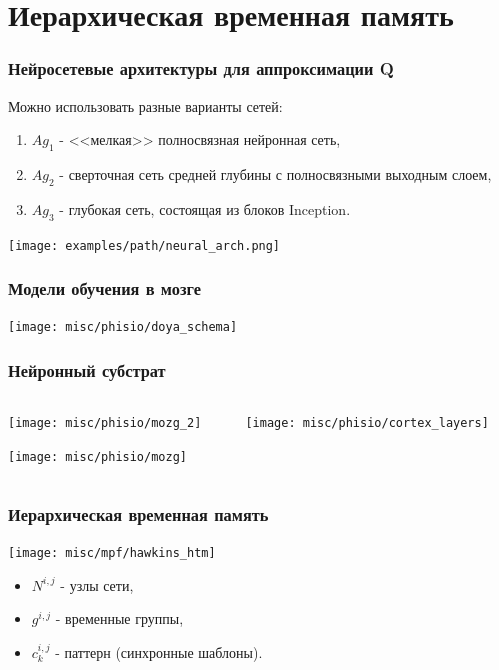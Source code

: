 \documentclass[12pt]{beamer}
\begin{document}
	\section{Иерархическая временная память}

	\begin{frame}
		\frametitle{Нейросетевые архитектуры для аппроксимации Q}
		Можно использовать разные варианты сетей:
		\begin{enumerate}
			\item $Ag_1$ - <<мелкая>> полносвязная нейронная сеть,
			\item $Ag_2$ - сверточная сеть средней глубины с полносвязными выходным слоем,
			\item $Ag_3$ - глубокая сеть, состоящая из блоков Inception.
		\end{enumerate}
		\centering
		\texttt{[image: examples/path/neural\_arch.png]}
	\end{frame}
	
	\begin{frame}
		\frametitle{Модели обучения в мозге}
		
		\begin{center}
			\texttt{[image: misc/phisio/doya\_schema]}
		\end{center}

	\end{frame}	
	
	\begin{frame}
		\frametitle{Нейронный субстрат}
		
		\begin{columns}
		\begin{column}{0.35\textwidth}
			\texttt{[image: misc/phisio/mozg\_2]}
			\par\bigskip
			\hspace{-7mm}\texttt{[image: misc/phisio/mozg]}
		\end{column}
		\begin{column}{0.65\textwidth}
			\texttt{[image: misc/phisio/cortex\_layers]}
		\end{column}
		\end{columns}

	\end{frame}
		
		
	\begin{frame}
		\frametitle{Иерархическая временная память}
		
		\begin{center}
		\texttt{[image: misc/mpf/hawkins\_htm]}
		\end{center}
		\par\bigskip
		\begin{itemize}
			\item $N^{i,j}$ - узлы сети,
			\item $g^{i,j}$ - временные группы,
			\item $c^{i,j}_k$ - паттерн (синхронные шаблоны).
		\end{itemize}
				
	\end{frame}
		
\end{document}
